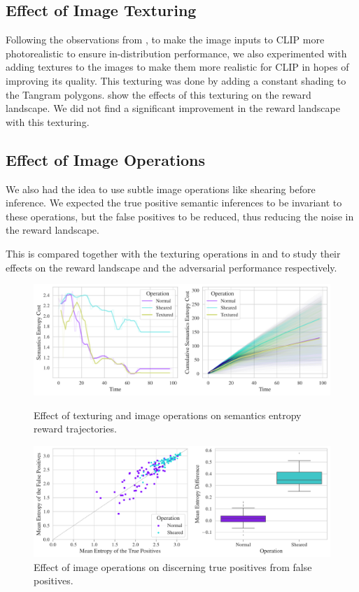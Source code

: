 \subsection{Effect of Image Texturing}
\label{sec:image-texturing}
Following the observations from \cite{vlmrm}, to make the image inputs to CLIP more photorealistic to ensure in-distribution performance, we also experimented with adding textures to the images to make them more realistic for CLIP in hopes of improving its quality.
This texturing was done by adding a constant shading to the Tangram polygons.
 show the effects of this texturing on the reward landscape.
We did not find a significant improvement in the reward landscape with this texturing.

\subsection{Effect of Image Operations}
\label{sec:image-operations}
We also had the idea to use subtle image operations like shearing before inference.
We expected the true positive semantic inferences to be invariant to these operations, but the false positives to be reduced, thus reducing the noise in the reward landscape.

This is compared together with the texturing operations in  and  to study their effects on the reward landscape and the adversarial performance respectively.

\begin{figure}[H]
    \centering
    \includegraphics[width=\textwidth]{images/texturing_operations_comparison.pdf}
    \caption{Effect of texturing and image operations on semantics entropy reward trajectories.}
    \label{fig:texturing-operations}
    \vspace{12pt}
    \includegraphics[width=\textwidth]{images/texturing-operations_adversarial_2.pdf}
    \caption{Effect of image operations on discerning true positives from false positives.}
    \label{fig:texturing-operations-adversarial}
\end{figure}

